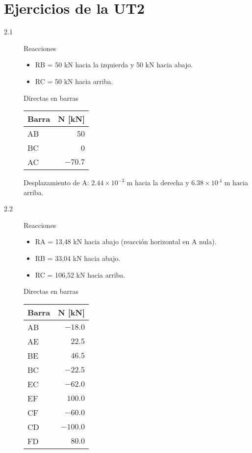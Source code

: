 \section{Ejercicios de la UT2}




\begin{description}
\item [2.1]
%
Reacciones
\begin{itemize}
\item RB = 50 kN hacia la izquierda y 50 kN hacia abajo.
\item RC = 50 kN hacia arriba.
\end{itemize}


Directas en barras
\begin{center}
\begin{tabular}{lr}
\hline
Barra & N [kN] \\
\hline
AB & 50 \\
BC & 0 \\
AC & $-70.7$\\
\hline
\end{tabular}
\end{center}

Desplazamiento de A: $2.44 \times  10^{-3}$ m hacia la derecha y $6.38 \times 10^{.4}$ m hacia arriba.

%
\item [2.2]

Reacciones
\begin{itemize}
\item RA = 13,48 kN hacia abajo (reacción horizontal en A nula).
\item RB = 33,04 kN hacia abajo.
\item  RC = 106,52 kN hacia arriba.
\end{itemize}

Directas en barras
\begin{center}
	\begin{tabular}{lr}
		\hline
Barra & N [kN] \\
\hline
AB & $-18.0$ \\
AE & $22.5$ \\
BE & $46.5$ \\
BC & $-22.5$ \\
EC & $-62.0$ \\
EF & $100.0$ \\
CF & $-60.0$ \\
CD & $-100.0$ \\
FD & $80.0$ \\
\hline
\end{tabular}
\end{center}


\end{description}
